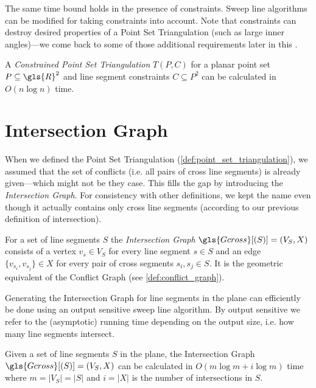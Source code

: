 The same time bound holds in the presence of constraints. Sweep line 
algorithms can be modified for taking constraints into account. Note
that constraints can destroy desired properties of a Point Set
Triangulation (such as large inner angles)---we come back to some of
those additional requirements later in this
.

\begin{theorem}
  A \emph{Constrained Point Set Triangulation} \(T(P, C)\)
  for a planar point set \(P \subseteq \gls{R}^2\)
  and line segment constraints \(C \subseteq P^2\)
  can be calculated in \(O(n \log n)\) time.
  \cite{constrained_triangulation}
\end{theorem}

\section{Intersection Graph}
\label{sec:intersection_graph}
When we defined the Point Set Triangulation
(\cref{def:point_set_triangulation}), we assumed that the set of 
conflicts (i.e. all pairs of \gls{cross} line segments) is already
given---which might not be they case. This
 fills the gap by introducing the
\emph{Intersection Graph}. For consistency with other definitions, we
kept the name even though it actually contains only \gls{cross} line
segments (according to our previous definition of intersection).

\begin{definition}
  \label{def:intersection_graph}
  For a set of line segments \(S\) the
  \emph{Intersection Graph} \(\gls{Gcross}[(S)] = (V_S,X)\) consists
  of a vertex \(v_s \in V_S\) for every line segment \(s \in S\)
  and an edge \(\{v_{s_i}, v_{s_j}\} \in X\)
  for every pair of \gls{cross} segments \(s_i, s_j \in S\).
  It is the geometric equivalent of the Conflict Graph
  (see \cref{def:conflict_graph}).
\end{definition}

Generating the Intersection Graph for line segments in the plane can
efficiently be done using an output sensitive sweep line algorithm.
By output sensitive we refer to the (asymptotic) running time
depending on the output size, i.e. how many line segments intersect.

\begin{theorem}
  \label{thm:sweep_bound}
  Given a set of line segments \(S\) in the plane,
  the Intersection Graph \(\gls{Gcross}[(S)] = (V_S,X)\)
  can be calculated in \(O(m \log m + i \log m)\) time
  where \(m = |V_S| = |S|\)
  and \(i = |X|\) is the number of intersections in \(S\).
  \cite[Lemma 2.3]{deberg_compgeom}
\end{theorem}

